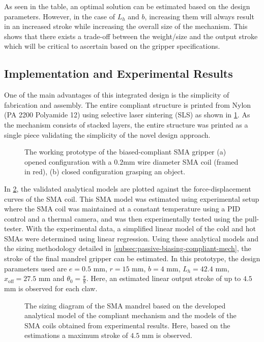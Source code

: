 As seen in the table, an optimal solution can be estimated based on the design parameters. However, in the case of $L_h$ and $b$, increasing them will always result in an increased stroke while increasing the overall size of the mechanism. This shows that there exists a trade-off between the weight/size and the output stroke which will be critical to ascertain based on the gripper specifications.

\subsection{Implementation and Experimental Results}
One of the main advantages of this integrated design is the simplicity of fabrication and assembly. The entire compliant structure is printed from Nylon (PA 2200 Polyamide 12) using selective laser sintering (SLS) as shown in \cref{fig:mandrel-finalproto}. As the mechanism consists of stacked layers, the entire structure was printed as a single piece validating the simplicity of the novel design approach.

\begin{figure}[hbt!]
    \centering
    \resizebox{0.9\textwidth}{!}{}
    \caption{The working prototype of the biased-compliant SMA gripper (a) opened configuration with a $0.2$mm wire diameter SMA coil (framed in red), (b) closed configuration grasping an object.}
    \label{fig:mandrel-finalproto}
\end{figure}

In \cref{fig:mandrel-stroke-estimation}, the validated analytical models are plotted against the force-displacement curves of the SMA coil. This SMA model was estimated using experimental setup where the SMA coil was maintained at a constant temperature using a PID control and a thermal camera, and was then experimentally tested using the pull-tester. With the experimental data, a simplified linear model of the cold and hot SMAs were determined using linear regression. Using these analytical models and the sizing methodology detailed in \cref{subsec:passive-biasing-compliant-mech}, the stroke of the final mandrel gripper can be estimated. In this prototype, the design parameters used are $e=0.5$ mm, $r=15$ mm, $b=4$ mm, $L_h=42.4$ mm, $x_\text{off}=27.5$ mm and $\theta_0 = \frac{\pi}{8}$. Here, an estimated linear output stroke of up to $4.5$ mm is observed for each claw.

\begin{figure}[hbt!] %
  \centering
  \resizebox{0.7\textwidth}{!}{}
  \caption{The sizing diagram of the SMA mandrel based on the developed analytical model of the compliant mechanism and the models of the SMA coils obtained from experimental results. Here, based on the estimations a maximum stroke of $4.5$ mm is observed.}
  \label{fig:mandrel-stroke-estimation}
\end{figure}

